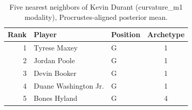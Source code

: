 \begin{table}[htbp]
  \centering\small
  \begin{tabular}{rllc}
    \toprule
    Rank & Player & Position & Archetype \\
    \midrule
    1 & Tyrese Maxey & G & 1 \\
    2 & Jordan Poole & G & 1 \\
    3 & Devin Booker & G & 1 \\
    4 & Duane Washington Jr. & G & 1 \\
    5 & Bones Hyland & G & 4 \\
    \bottomrule
  \end{tabular}
  \caption{Five nearest neighbors of Kevin Durant (curvature_m1 modality), Procrustes-aligned posterior mean.}
  \label{tab:Kevin_Durant_neighbors_curvature_m1}
\end{table}

